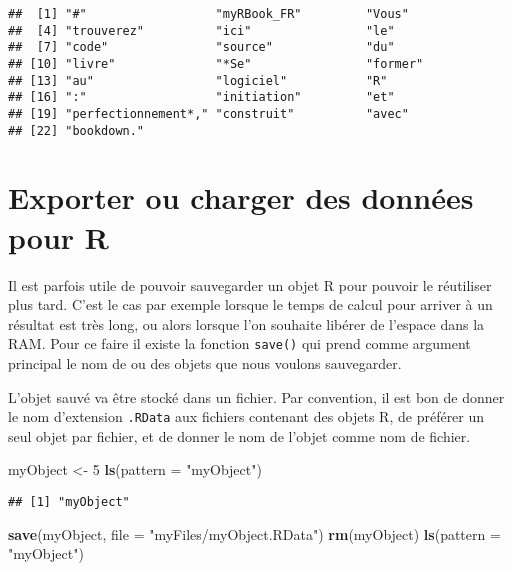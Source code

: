 \documentclass[]{book}
\newenvironment{Shaded}{\begin{snugshade}}{\end{snugshade}}
\newcommand{\KeywordTok}[1]{\textcolor[rgb]{0.13,0.29,0.53}{\textbf{#1}}}
\newcommand{\DataTypeTok}[1]{\textcolor[rgb]{0.13,0.29,0.53}{#1}}
\newcommand{\DecValTok}[1]{\textcolor[rgb]{0.00,0.00,0.81}{#1}}
\newcommand{\StringTok}[1]{\textcolor[rgb]{0.31,0.60,0.02}{#1}}
\newcommand{\NormalTok}[1]{#1}
\theoremstyle{definition}
\theoremstyle{definition}
\theoremstyle{definition}
\theoremstyle{remark}
\begin{document}
\begin{verbatim}
##  [1] "#"                  "myRBook_FR"         "Vous"              
##  [4] "trouverez"          "ici"                "le"                
##  [7] "code"               "source"             "du"                
## [10] "livre"              "*Se"                "former"            
## [13] "au"                 "logiciel"           "R"                 
## [16] ":"                  "initiation"         "et"                
## [19] "perfectionnement*," "construit"          "avec"              
## [22] "bookdown."
\end{verbatim}

\section{Exporter ou charger des données pour R}\label{l016save}

Il est parfois utile de pouvoir sauvegarder un objet R pour pouvoir le
réutiliser plus tard. C'est le cas par exemple lorsque le temps de
calcul pour arriver à un résultat est très long, ou alors lorsque l'on
souhaite libérer de l'espace dans la RAM. Pour ce faire il existe la
fonction \texttt{save()} qui prend comme argument principal le nom de ou
des objets que nous voulons sauvegarder.

L'objet sauvé va être stocké dans un fichier. Par convention, il est bon
de donner le nom d'extension \texttt{.RData} aux fichiers contenant des
objets R, de préférer un seul objet par fichier, et de donner le nom de
l'objet comme nom de fichier.

\begin{Shaded}
\begin{Highlighting}[]
\NormalTok{myObject <-}\StringTok{ }\DecValTok{5}
\KeywordTok{ls}\NormalTok{(}\DataTypeTok{pattern =} \StringTok{"myObject"}\NormalTok{)}
\end{Highlighting}
\end{Shaded}

\begin{verbatim}
## [1] "myObject"
\end{verbatim}

\begin{Shaded}
\begin{Highlighting}[]
\KeywordTok{save}\NormalTok{(myObject, }\DataTypeTok{file =} \StringTok{"myFiles/myObject.RData"}\NormalTok{)}
\KeywordTok{rm}\NormalTok{(myObject)}
\KeywordTok{ls}\NormalTok{(}\DataTypeTok{pattern =} \StringTok{"myObject"}\NormalTok{)}
\end{Highlighting}
\end{Shaded}
\end{document}
